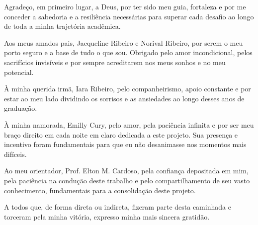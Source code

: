 \begin{agradecimentos}
Agradeço, em primeiro lugar, a Deus, por ter sido meu guia, fortaleza e por me conceder a sabedoria e a resiliência necessárias para superar cada desafio ao longo de toda a minha trajetória acadêmica.

Aos meus amados pais, Jacqueline Ribeiro e Norival Ribeiro, por serem o meu porto seguro e a base de tudo o que sou. Obrigado pelo amor incondicional, pelos sacrifícios invisíveis e por sempre acreditarem nos meus sonhos e no meu potencial.

À minha querida irmã, Iara Ribeiro, pelo companheirismo, apoio constante e por estar ao meu lado dividindo os sorrisos e as ansiedades ao longo desses anos de graduação.

À minha namorada, Emilly Cury, pelo amor, pela paciência infinita e por ser meu braço direito em cada noite em claro dedicada a este projeto. Sua presença e incentivo foram fundamentais para que eu não desanimasse nos momentos mais difíceis.

Ao meu orientador, Prof. Elton M. Cardoso, pela confiança depositada em mim, pela paciência na condução deste trabalho e pelo compartilhamento de seu vasto conhecimento, fundamentais para a consolidação deste projeto.

A todos que, de forma direta ou indireta, fizeram parte desta caminhada e torceram pela minha vitória, expresso minha mais sincera gratidão.
\end{agradecimentos}